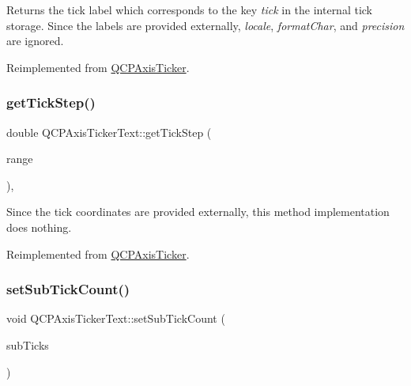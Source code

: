 Returns the tick label which corresponds to the key {\itshape tick} in the internal tick storage. Since the labels are provided externally, {\itshape locale}, {\itshape format\+Char}, and {\itshape precision} are ignored.

Reimplemented from \hyperlink{class_q_c_p_axis_ticker}{Q\+C\+P\+Axis\+Ticker}.

\mbox{\label{class_q_c_p_axis_ticker_text_a628f16c41905e8c95c6622d6757a38c4}} 
\subsubsection{\texorpdfstring{get\+Tick\+Step()}{getTickStep()}}
{\footnotesize\ttfamily double Q\+C\+P\+Axis\+Ticker\+Text\+::get\+Tick\+Step (\begin{DoxyParamCaption}\item[{const \hyperlink{class_q_c_p_range}{Q\+C\+P\+Range} \&}]{range }\end{DoxyParamCaption})\hspace{0.3cm}{\ttfamily [protected]}, {\ttfamily [virtual]}}

Since the tick coordinates are provided externally, this method implementation does nothing.

Reimplemented from \hyperlink{class_q_c_p_axis_ticker}{Q\+C\+P\+Axis\+Ticker}.

\mbox{\label{class_q_c_p_axis_ticker_text_a8cfa50c51183c90186892eeef978d571}} 
\subsubsection{\texorpdfstring{set\+Sub\+Tick\+Count()}{setSubTickCount()}}
{\footnotesize\ttfamily void Q\+C\+P\+Axis\+Ticker\+Text\+::set\+Sub\+Tick\+Count (\begin{DoxyParamCaption}\item[{int}]{sub\+Ticks }\end{DoxyParamCaption})}

